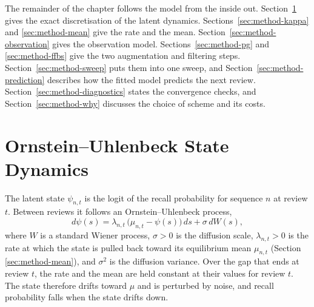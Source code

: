 The remainder of the chapter follows the model from the inside out. Section~\ref{sec:method-ou}
gives the exact discretisation of the latent dynamics. Sections~\ref{sec:method-kappa} and
\ref{sec:method-mean} give the rate and the mean. Section~\ref{sec:method-observation} gives the
observation model. Sections~\ref{sec:method-pg} and \ref{sec:method-ffbs} give the two augmentation
and filtering steps. Section~\ref{sec:method-sweep} puts them into one sweep, and
Section~\ref{sec:method-prediction} describes how the fitted model predicts the next review.
Section~\ref{sec:method-diagnostics} states the convergence checks, and
Section~\ref{sec:method-why} discusses the choice of scheme and its costs.

\section{Ornstein--Uhlenbeck State Dynamics}
\label{sec:method-ou}

The latent state $\psi_{n,t}$ is the logit of the recall probability for sequence $n$ at review $t$.
Between reviews it follows an Ornstein--Uhlenbeck process,
\begin{equation}\label{eq:ou-sde}
  d\psi(s) = \lambda_{n,t}\,\bigl(\mu_{n,t} - \psi(s)\bigr)\,ds + \sigma\,dW(s),
\end{equation}
where $W$ is a standard Wiener process, $\sigma > 0$ is the diffusion scale, $\lambda_{n,t} > 0$ is
the rate at which the state is pulled back toward its equilibrium mean $\mu_{n,t}$ (Section
\ref{sec:method-mean}), and $\sigma^2$ is the diffusion variance. Over the gap that ends at review
$t$, the rate and the mean are held constant at their values for review $t$. The state therefore
drifts toward $\mu$ and is perturbed by noise, and recall probability falls when the state drifts
down.

